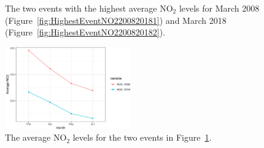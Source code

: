 \documentclass[a4paper,11pt]{article}
\begin{document}
\begin{figure}[!htb]
	\centering
 \caption{The two events with the highest average $\text{NO}_2$ levels for March 2008 (Figure~\ref{fig:HighestEventNO2200820181}) and March 2018 (Figure~\ref{fig:HighestEventNO2200820182}).}
 \label{fig:HighestEventNO220082018}
\end{figure}

\begin{figure}[!htb]
    \centering
    \includegraphics[width=0.48\textwidth]{./Graphics/Highest_Event_NO2_2008_2018.pdf} 
     \caption{The average $\text{NO}_2$ levels for the two events in Figure~\ref{fig:HighestEventNO220082018}.}
    \label{fig:HighestEventNO2200820183}
\end{figure}
\end{document}
